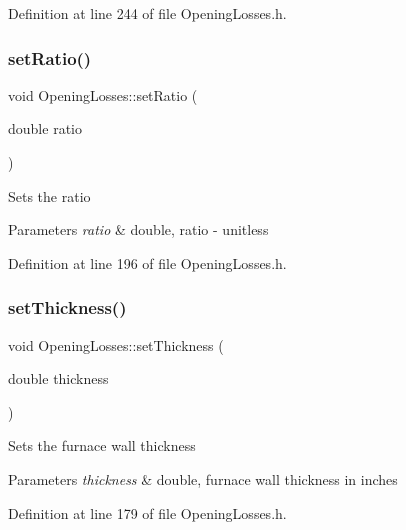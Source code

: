 Definition at line 244 of file Opening\+Losses.\+h.

\mbox{\label{class_opening_losses_aab7f82f24511c37f0bc4b29cbc7239b5}} 
\subsubsection{\texorpdfstring{set\+Ratio()}{setRatio()}}
{\footnotesize\ttfamily void Opening\+Losses\+::set\+Ratio (\begin{DoxyParamCaption}\item[{double}]{ratio }\end{DoxyParamCaption})\hspace{0.3cm}{\ttfamily [inline]}}

Sets the ratio 
\begin{DoxyParams}{Parameters}
{\em ratio} & double, ratio -\/ unitless \\
\hline
\end{DoxyParams}


Definition at line 196 of file Opening\+Losses.\+h.

\mbox{\label{class_opening_losses_a221cc88072e4f0975f15c6cd96781dea}} 
\subsubsection{\texorpdfstring{set\+Thickness()}{setThickness()}}
{\footnotesize\ttfamily void Opening\+Losses\+::set\+Thickness (\begin{DoxyParamCaption}\item[{double}]{thickness }\end{DoxyParamCaption})\hspace{0.3cm}{\ttfamily [inline]}}

Sets the furnace wall thickness 
\begin{DoxyParams}{Parameters}
{\em thickness} & double, furnace wall thickness in inches \\
\hline
\end{DoxyParams}


Definition at line 179 of file Opening\+Losses.\+h.

